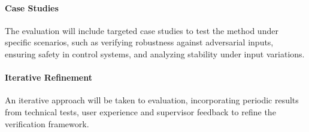 \paragraph{Case Studies}
The evaluation will include targeted case studies to test the method under specific scenarios, such as verifying robustness against adversarial inputs, ensuring safety in control systems, and analyzing stability under input variations.

\paragraph{Iterative Refinement}
An iterative approach will be taken to evaluation, incorporating periodic results from technical tests, user experience and supervisor feedback to refine the verification framework.